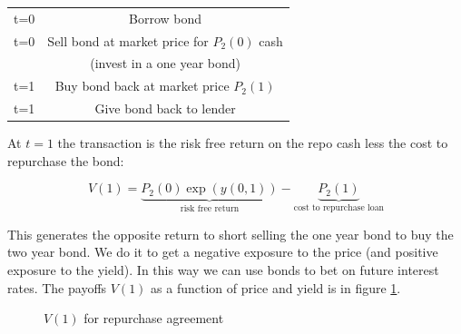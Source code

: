 \begin{center}
\begin{tabular}{|c|c|}
\hline
t=0 & Borrow bond \\
t=0 & Sell bond at market price for $P_{2}(0)$ cash  \\
       & (invest in a one year bond)\\
\hline
t=1 & Buy bond back at market price $P_2(1)$ \\
t=1 & Give bond back to lender\\
\hline
\end{tabular}
\end{center}

At $t=1$ the transaction is the risk free return on the repo cash less the cost to repurchase the bond: 

\[ V(1) =  \underbrace{P_2(0)\exp(y(0,1))}_{\textrm{risk free return}} - \underbrace{P_2(1)}_{\textrm{cost to repurchase loan}} \]

This generates the opposite return to short selling the one year bond to buy the two year bond. We do it to get a negative exposure to the price (and positive exposure to the yield). In this way we can use bonds to bet on future interest rates. The payoffs $V(1)$ as a function of price and yield is in figure \ref{fig:repo}.


\begin{figure}[ht]
\centering


\caption{$V(1)$ for repurchase agreement}
\label{fig:repo}
\end{figure}


